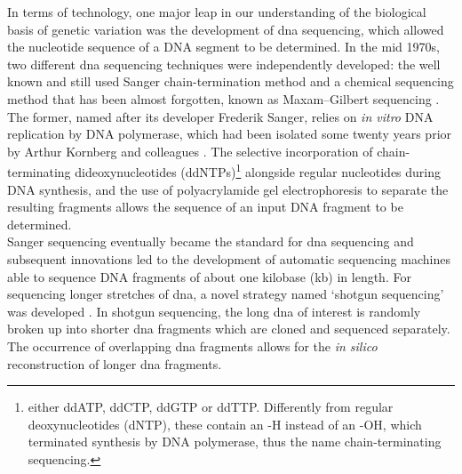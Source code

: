 In terms of technology, one major leap in our understanding of the biological basis of genetic variation was the development of \gls{dna} sequencing, which allowed the nucleotide sequence of a DNA segment to be determined.
In the mid 1970s, two different \gls{dna} sequencing techniques were independently developed: the well known and still used Sanger chain-termination method \cite{sanger1975rapid, sanger1977dna} and a chemical sequencing method that has been almost forgotten, known as Maxam–Gilbert sequencing \cite{maxam1977new}.
The former, named after its developer Frederik Sanger,
relies on \textit{in vitro} DNA replication by DNA polymerase,
which had been isolated some twenty years prior by Arthur Kornberg and colleagues \cite{kornberg1956enzymic}.
The selective incorporation of chain-terminating dideoxynucleotides (ddNTPs)\footnote{either ddATP, ddCTP, ddGTP or ddTTP.
Differently from regular deoxynucleotides (dNTP), these contain an -H instead of an -OH, which terminated synthesis by DNA polymerase, thus the name chain-terminating sequencing.} alongside regular nucleotides during DNA synthesis, and the use of polyacrylamide gel electrophoresis to separate the resulting fragments allows
the sequence of an input DNA fragment to be determined. \\

Sanger sequencing eventually became the standard for \gls{dna} sequencing and
subsequent innovations led to the development of automatic sequencing machines able to sequence DNA fragments of about one kilobase (kb) in length. 
For sequencing longer stretches of \gls{dna}, a novel strategy named `shotgun sequencing' was developed \cite{staden1979strategy, anderson1981shotgun}. 
In shotgun sequencing, the long \gls{dna} of interest is randomly broken up into shorter \gls{dna} fragments which are cloned and sequenced separately. 
The occurrence of overlapping \gls{dna} fragments 
allows for the \textit{in silico} reconstruction of longer \gls{dna} fragments. \\

